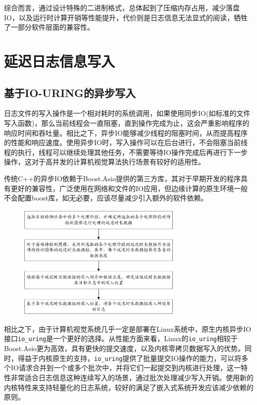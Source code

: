 \documentclass[master,anonymous]{shtthesis}
\begin{document}
综合而言，通过设计特殊的二进制格式，总体起到了压缩内存占用，减少落盘IO，以及运行时计算开销等性能提升，代价则是日志信息无法显式的阅读，牺牲了一部分软件层面的兼容性。

\section{延迟日志信息写入}
\subsection{基于IO-URING的异步写入}

日志文件的写入操作是一个相对耗时的系统调用，如果使用同步IO(如标准的文件写入函数)，那么当前线程会一直阻塞，直到操作完成为止，这会严重影响程序的响应时间和吞吐量。相比之下，异步IO能够减少线程的阻塞时间，从而提高程序的性能和响应速度。使用异步IO时，写入操作可以在后台进行，不会阻塞当前线程的执行，线程可以继续处理其他任务，不需要等待IO操作完成后再进行下一步操作，这对于高并发的计算机视觉算法执行场景有较好的适用性。

传统C++的异步IO依赖于Boost.Asio\cite{anggoro2015boost}提供的第三方库，其对于早期开发的程序具有更好的兼容性，广泛使用在网络和文件的IO应用，但边缘计算的原生环境一般不会配置boost库，如无必要，应该尽量减少引入额外的软件依赖。

\begin{figure}[htbp]
	\centering
	\includegraphics[width=8cm]{img/z1.png}
	\label{延迟异步IO写入方式}
\end{figure}

相比之下，由于计算机视觉系统几乎一定是部署在Linux系统中，原生内核异步IO接口\verb*|io_uring|是一个更好的选择。从性能方面来看，Linux的\verb*|io_uring|相较于Boost.Asio更为高效，具有更快的提交速度，以及内核零拷贝数据写入的优势。同时，得益于内核原生的支持，\verb*|io_uring|提供了批量提交IO操作的能力，可以将多个IO请求合并到一个或多个批次中，并将它们一起提交到内核进行处理，这一特性非常适合日志信息这种连续写入的场景，通过批次处理减少写入开销。使用新的内核特性来支持轻量化的日志系统，较好的满足了嵌入式系统开发应该减少依赖的原则。
\end{document}
